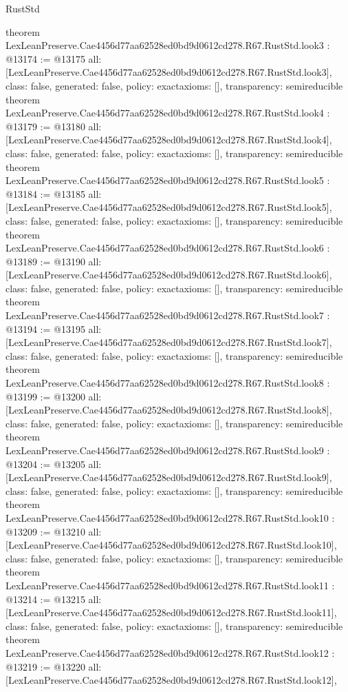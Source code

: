\begin{lexlean}{RustStd}
\begin{coremodule}
{}
theorem LexLeanPreserve.Cae4456d77aa62528ed0bd9d0612cd278.R67.RustStd.look3 : @13174 := @13175 {
  all: [LexLeanPreserve.Cae4456d77aa62528ed0bd9d0612cd278.R67.RustStd.look3],
  class: false,
  generated: false,
  policy: exact{axioms: []},
  transparency: semireducible
}
theorem LexLeanPreserve.Cae4456d77aa62528ed0bd9d0612cd278.R67.RustStd.look4 : @13179 := @13180 {
  all: [LexLeanPreserve.Cae4456d77aa62528ed0bd9d0612cd278.R67.RustStd.look4],
  class: false,
  generated: false,
  policy: exact{axioms: []},
  transparency: semireducible
}
theorem LexLeanPreserve.Cae4456d77aa62528ed0bd9d0612cd278.R67.RustStd.look5 : @13184 := @13185 {
  all: [LexLeanPreserve.Cae4456d77aa62528ed0bd9d0612cd278.R67.RustStd.look5],
  class: false,
  generated: false,
  policy: exact{axioms: []},
  transparency: semireducible
}
theorem LexLeanPreserve.Cae4456d77aa62528ed0bd9d0612cd278.R67.RustStd.look6 : @13189 := @13190 {
  all: [LexLeanPreserve.Cae4456d77aa62528ed0bd9d0612cd278.R67.RustStd.look6],
  class: false,
  generated: false,
  policy: exact{axioms: []},
  transparency: semireducible
}
theorem LexLeanPreserve.Cae4456d77aa62528ed0bd9d0612cd278.R67.RustStd.look7 : @13194 := @13195 {
  all: [LexLeanPreserve.Cae4456d77aa62528ed0bd9d0612cd278.R67.RustStd.look7],
  class: false,
  generated: false,
  policy: exact{axioms: []},
  transparency: semireducible
}
theorem LexLeanPreserve.Cae4456d77aa62528ed0bd9d0612cd278.R67.RustStd.look8 : @13199 := @13200 {
  all: [LexLeanPreserve.Cae4456d77aa62528ed0bd9d0612cd278.R67.RustStd.look8],
  class: false,
  generated: false,
  policy: exact{axioms: []},
  transparency: semireducible
}
theorem LexLeanPreserve.Cae4456d77aa62528ed0bd9d0612cd278.R67.RustStd.look9 : @13204 := @13205 {
  all: [LexLeanPreserve.Cae4456d77aa62528ed0bd9d0612cd278.R67.RustStd.look9],
  class: false,
  generated: false,
  policy: exact{axioms: []},
  transparency: semireducible
}
theorem LexLeanPreserve.Cae4456d77aa62528ed0bd9d0612cd278.R67.RustStd.look10 : @13209 := @13210 {
  all: [LexLeanPreserve.Cae4456d77aa62528ed0bd9d0612cd278.R67.RustStd.look10],
  class: false,
  generated: false,
  policy: exact{axioms: []},
  transparency: semireducible
}
theorem LexLeanPreserve.Cae4456d77aa62528ed0bd9d0612cd278.R67.RustStd.look11 : @13214 := @13215 {
  all: [LexLeanPreserve.Cae4456d77aa62528ed0bd9d0612cd278.R67.RustStd.look11],
  class: false,
  generated: false,
  policy: exact{axioms: []},
  transparency: semireducible
}
theorem LexLeanPreserve.Cae4456d77aa62528ed0bd9d0612cd278.R67.RustStd.look12 : @13219 := @13220 {
  all: [LexLeanPreserve.Cae4456d77aa62528ed0bd9d0612cd278.R67.RustStd.look12],
}
\end{coremodule}
\end{lexlean}
